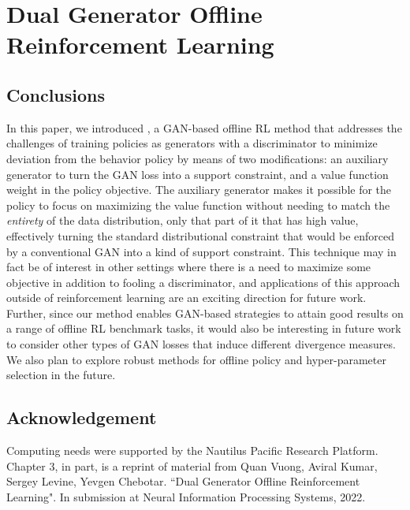 \chapter{Dual Generator Offline Reinforcement Learning}















\section{Conclusions}

In this paper, we introduced \name{}, a GAN-based offline RL method that addresses the challenges of training policies as generators with a discriminator to minimize deviation from the behavior policy by means of two modifications: an auxiliary generator to turn the GAN loss into a support constraint, and a value function weight in the policy objective. The auxiliary generator makes it possible for the policy to focus on maximizing the value function without needing to match the \emph{entirety} of the data distribution, only that part of it that has high value, effectively turning the standard distributional constraint that would be enforced by a conventional GAN into a kind of support constraint. This technique may in fact be of interest in other settings where there is a need to maximize some objective in addition to fooling a discriminator, and applications of this approach outside of reinforcement learning are an exciting direction for future work. Further, since our method enables GAN-based strategies to attain good results on a range of offline RL benchmark tasks, it would also be interesting in future work to consider other types of GAN losses that induce different divergence measures. We also plan to explore robust methods for offline policy and hyper-parameter selection in the future.

\section{Acknowledgement}

Computing needs were supported by the Nautilus Pacific Research Platform. Chapter 3, in part, is a reprint of material from Quan Vuong, Aviral Kumar, Sergey Levine, Yevgen Chebotar. ``Dual Generator Offline Reinforcement Learning". In submission at Neural Information Processing Systems, 2022.

